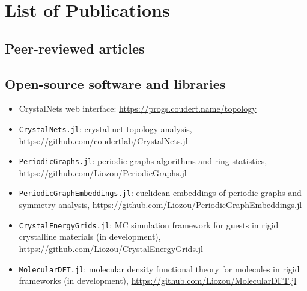 \documentclass[main.tex]{subfiles}
\begin{document}
\chapter*{List of Publications}

\begin{refsection}
	\nocite{*}

	\section*{Peer-reviewed articles}
	\printbibliography[heading=none]

	\section*{Open-source software and libraries}
	\begin{itemize}
		\item CrystalNets web interface: \url{https://progs.coudert.name/topology}
		\item \texttt{CrystalNets.jl}: crystal net topology analysis, \url{https://github.com/coudertlab/CrystalNets.jl}
		\item \texttt{PeriodicGraphs.jl}: periodic graphs algorithms and ring statistics, \url{https://github.com/Liozou/PeriodicGraphs.jl}
		\item \texttt{PeriodicGraphEmbeddings.jl}: euclidean embeddings of periodic graphs and symmetry analysis, \url{https://github.com/Liozou/PeriodicGraphEmbeddings.jl}
		\item \texttt{CrystalEnergyGrids.jl}: MC simulation framework for guests in rigid crystalline materials (in development), \url{https://github.com/Liozou/CrystalEnergyGrids.jl}
		\item \texttt{MolecularDFT.jl}: molecular density functional theory for molecules in rigid frameworks (in development), \url{https://github.com/Liozou/MolecularDFT.jl}
	\end{itemize}
\end{refsection}

\end{document}
